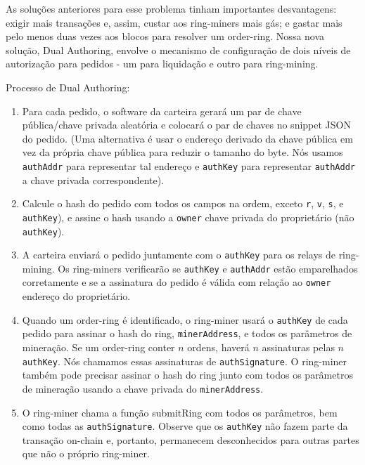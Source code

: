 \documentclass[UTF8,nofonts]{article}
\begin{document}
\begin{multicols}{2}
As soluções anteriores para esse problema tinham importantes desvantagens: exigir mais transações e, assim, custar aos ring-miners mais gás; e gastar mais pelo menos duas vezes aos blocos para resolver um order-ring.  Nossa nova solução, Dual Authoring\cite{dualauthor}, envolve o mecanismo de configuração de dois níveis de autorização para pedidos - um para liquidação e outro para ring-mining.

Processo de Dual Authoring:

\begin{enumerate}

	\item Para cada pedido, o software da carteira gerará
um par de chave pública/chave privada aleatória e colocará o par de chaves no snippet JSON do pedido. (Uma alternativa é usar o endereço derivado da chave pública em vez da própria chave pública para reduzir o tamanho do byte. Nós usamos \verb|authAddr| para representar tal endereço e \verb|authKey| para representar \verb|authAddr| a chave privada correspondente).

	\item Calcule o hash do pedido com todos os campos na ordem, exceto \verb|r|, \verb|v|, \verb|s|, e \verb|authKey|), e assine o hash usando a  \verb|owner| chave privada do proprietário (não \verb|authKey|).

	\item A carteira enviará o pedido juntamente com o \verb|authKey| para os relays de ring-mining. Os ring-miners verificarão se  \verb|authKey| e \verb|authAddr| estão emparelhados corretamente e se a assinatura do pedido é válida com relação ao \verb|owner| endereço do proprietário.

	\item Quando um order-ring é identificado, o ring-miner usará o \verb|authKey| de cada pedido para assinar o hash do ring, \verb|minerAddress|, e todos os parâmetros de mineração. Se um order-ring conter $n$ ordens, haverá $n$ assinaturas pelas $n$ \verb|authKey|. Nós chamamos essas assinaturas de \verb|authSignature|. O ring-miner também pode precisar assinar o hash do ring junto com todos os parâmetros de mineração usando a chave privada do \verb|minerAddress|.

	\item O ring-miner chama a função submitRing com
todos os parâmetros, bem como todas as \verb|authSignature|. Observe que os \verb|authKey| não fazem parte da transação on-chain e, portanto, permanecem desconhecidos para outras partes que não o próprio ring-miner.



\end{enumerate}
\end{multicols}
\end{document}
